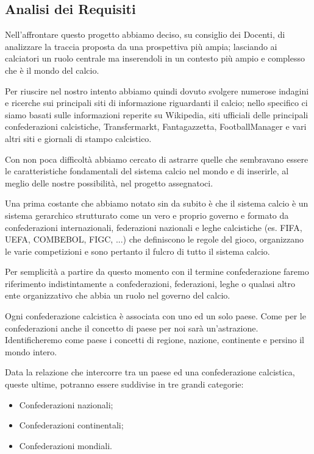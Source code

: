 \newpage
\subsection{Analisi dei Requisiti}

Nell'affrontare questo progetto abbiamo deciso, su consiglio dei Docenti, di analizzare
la traccia proposta da una prospettiva più ampia; lasciando ai calciatori un ruolo centrale
ma inserendoli in un contesto più ampio e complesso che è il mondo del calcio.

Per riuscire nel nostro intento abbiamo quindi dovuto svolgere numerose indagini e ricerche
sui principali siti di informazione riguardanti il calcio; nello specifico ci siamo basati sulle
informazioni reperite su Wikipedia, siti ufficiali delle principali confederazioni calcistiche,
Transfermarkt, Fantagazzetta, FootballManager e vari altri siti e giornali di stampo calcistico.

Con non poca difficoltà abbiamo cercato di astrarre quelle che sembravano essere le
caratteristiche fondamentali del sistema calcio nel mondo e di inserirle, al meglio delle nostre
possibilità, nel progetto assegnatoci.

\bigskip
\bigskip

Una prima costante che abbiamo notato sin da subito è che il sistema calcio è un sistema
gerarchico strutturato come un vero e proprio governo e formato da confederazioni internazionali,
federazioni nazionali e leghe calcistiche (es. FIFA, UEFA, COMBEBOL, FIGC, ...) che definiscono
le regole del gioco, organizzano le varie competizioni e sono pertanto il fulcro di
tutto il sistema calcio.

Per semplicità a partire da questo momento con il termine confederazione faremo
riferimento indistintamente a confederazioni, federazioni, leghe o qualasi altro ente
organizzativo che abbia un ruolo nel governo del calcio.

Ogni confederazione calcistica è associata con uno ed un solo paese.\newline
Come per le confederazioni anche il concetto di paese per noi sarà un'astrazione.
Identificheremo come paese i concetti di regione, nazione, continente e persino il mondo intero.

Data la relazione che intercorre tra un paese ed una confederazione calcistica, queste ultime,
potranno essere suddivise in tre grandi categorie:
\begin{itemize}
	\item Confederazioni nazionali;
	\item Confederazioni continentali;
	\item Confederazioni mondiali.
\end{itemize}

